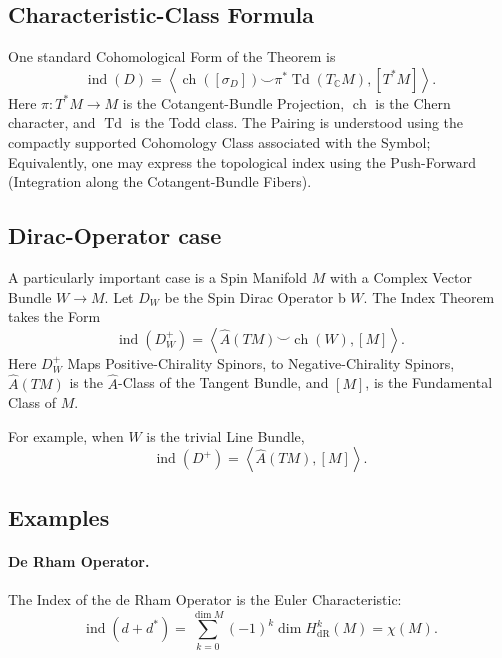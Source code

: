 \documentclass[a4paper, 10pt, onepage]{elegantbook}
\begin{document}
{\subsection{Characteristic-Class Formula}

One standard Cohomological Form of the Theorem is
\begin{equation}
\operatorname{ind}(D)
=
\left\langle
\operatorname{ch}([\sigma_D])\smile
\pi^*\operatorname{Td}(T_{\mathbb C}M),
[T^*M]
\right\rangle.
\end{equation}
Here \(\pi:T^*M\to M\) is the Cotangent-Bundle Projection,
\(\operatorname{ch}\) is the Chern character, and
\(\operatorname{Td}\) is the Todd class. The Pairing is understood using the compactly supported Cohomology Class associated with the Symbol; Equivalently, one may express the topological index using the Push-Forward (Integration along the Cotangent-Bundle Fibers).

\subsection{Dirac-Operator case}

A particularly important case is a Spin Manifold \(M\) with a Complex Vector Bundle \(W\to M\). Let \(D_W\) be the Spin Dirac Operator b
\(W\). The Index Theorem takes the Form
\begin{equation}
\operatorname{ind}(D_W^+)
=
\left\langle
\widehat{A}(TM)\smile\operatorname{ch}(W),
[M]
\right\rangle.
\end{equation}
Here \(D_W^+\) Maps Positive-Chirality Spinors, to Negative-Chirality Spinors, \(\widehat{A}(TM)\) is the \(\widehat{A}\)-Class of the Tangent Bundle, and \([M]\), is the Fundamental Class of \(M\).

For example, when \(W\) is the trivial Line Bundle,
\begin{equation}
\operatorname{ind}(D^+)
=
\left\langle\widehat{A}(TM),[M]\right\rangle.
\end{equation}

\subsection{Examples}

\paragraph{De Rham Operator.}
The Index of the de Rham Operator is the Euler Characteristic:
\begin{equation}
\operatorname{ind}(d+d^*)
=
\sum_{k=0}^{\dim M}(-1)^k\dim H^k_{\mathrm{dR}}(M)
=
\chi(M).
\end{equation}

}
\end{document}

